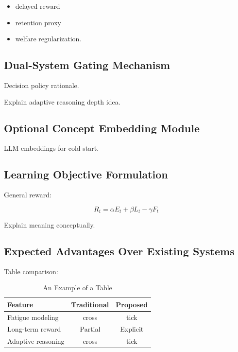 \documentclass[lettersize,journal]{IEEEtran}
\begin{document}
\begin{itemize}
    \item delayed reward
    \item retention proxy
    \item welfare regularization.
\end{itemize}    

\subsection{Dual-System Gating Mechanism}

Decision policy rationale.

Explain adaptive reasoning depth idea.

\subsection{Optional Concept Embedding Module}

LLM embeddings for cold start.

\subsection{Learning Objective Formulation}

General reward:

\begin{equation}
    R_t = \alpha E_t + \beta L_t - \gamma F_t
\end{equation}

Explain meaning conceptually.

\subsection{Expected Advantages Over Existing Systems}

Table comparison:

\begin{table}[!t]
\caption{An Example of a Table\label{tab:table1}}
\centering
\begin{tabular}{|l||c||c|}
\hline
Feature & Traditional & Proposed \\
\hline
Fatigue modeling & cross & tick \\
Long-term reward & Partial & Explicit \\
Adaptive reasoning & cross & tick \\
\hline
\end{tabular}
\end{table}
\end{document}
